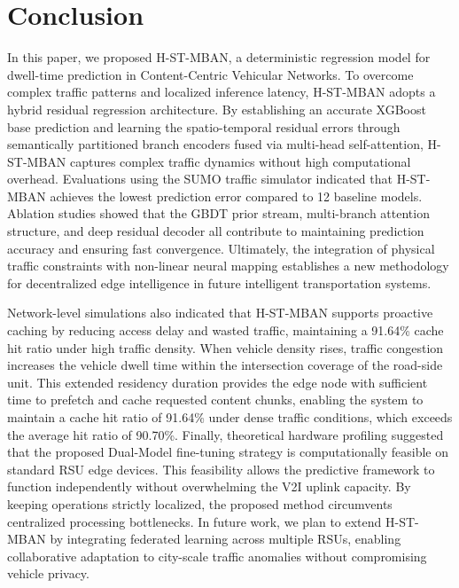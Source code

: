 \documentclass[journal]{IEEEtran}
\begin{document}
\section{Conclusion}\label{sec:conclusion}
In this paper, we proposed H-ST-MBAN, a deterministic regression model for dwell-time prediction in Content-Centric Vehicular Networks.
To overcome complex traffic patterns and localized inference latency, H-ST-MBAN adopts a hybrid residual regression architecture.
By establishing an accurate XGBoost base prediction and learning the spatio-temporal residual errors through semantically partitioned branch encoders fused via multi-head self-attention, H-ST-MBAN captures complex traffic dynamics without high computational overhead.
Evaluations using the SUMO traffic simulator indicated that H-ST-MBAN achieves the lowest prediction error compared to 12 baseline models.
Ablation studies showed that the GBDT prior stream, multi-branch attention structure, and deep residual decoder all contribute to maintaining prediction accuracy and ensuring fast convergence. Ultimately, the integration of physical traffic constraints with non-linear neural mapping establishes a new methodology for decentralized edge intelligence in future intelligent transportation systems.

Network-level simulations also indicated that H-ST-MBAN supports proactive caching by reducing access delay and wasted traffic, maintaining a 91.64\% cache hit ratio under high traffic density.
When vehicle density rises, traffic congestion increases the vehicle dwell time within the intersection coverage of the road-side unit.
This extended residency duration provides the edge node with sufficient time to prefetch and cache requested content chunks, enabling the system to maintain a cache hit ratio of 91.64\% under dense traffic conditions, which exceeds the average hit ratio of 90.70\%.
Finally, theoretical hardware profiling suggested that the proposed Dual-Model fine-tuning strategy is computationally feasible on standard RSU edge devices.
This feasibility allows the predictive framework to function independently without overwhelming the V2I uplink capacity.
By keeping operations strictly localized, the proposed method circumvents centralized processing bottlenecks.
In future work, we plan to extend H-ST-MBAN by integrating federated learning across multiple RSUs, enabling collaborative adaptation to city-scale traffic anomalies without compromising vehicle privacy.
\end{document}
